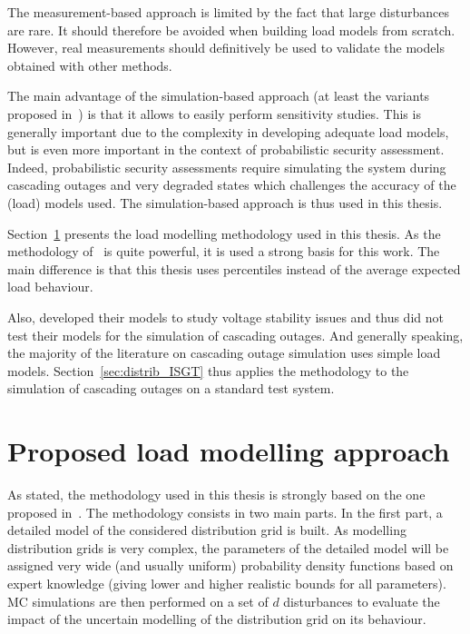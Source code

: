 The measurement-based approach is limited by the fact that large disturbances are rare. It should therefore be avoided when building load models from scratch. However, real measurements should definitively be used to validate the models obtained with other methods.

The main advantage of the simulation-based approach (at least the variants proposed in~\cite{ChaspierreThesis, ChaspierrePaper, Vorwerk}) is that it allows to easily perform sensitivity studies. This is generally important due to the complexity in developing adequate load models, but is even more important in the context of probabilistic security assessment. Indeed, probabilistic security assessments require simulating the system during cascading outages and very degraded states which challenges the accuracy of the (load) models used. The simulation-based approach is thus used in this thesis.

Section~\ref{sec:distrib_methodology} presents the load modelling methodology used in this thesis. As the methodology of~\cite{ChaspierreThesis, ChaspierrePaper} is quite powerful, it is used a strong basis for this work. The main difference is that this thesis uses percentiles instead of the average expected load behaviour.

Also, \cite{ChaspierreThesis, ChaspierrePaper} developed their models to study voltage stability issues and thus did not test their models for the simulation of cascading outages. And generally speaking, the majority of the literature on cascading outage simulation uses simple load models. Section~\ref{sec:distrib_ISGT} thus applies the methodology to the simulation of cascading outages on a standard test system.



\section{Proposed load modelling approach}
\label{sec:distrib_methodology}

As stated, the methodology used in this thesis is strongly based on the one proposed in~\cite{ChaspierrePaper, ChaspierreThesis}. The methodology consists in two main parts. In the first part, a detailed model of the considered distribution grid is built. As modelling distribution grids is very complex, the parameters of the detailed model will be assigned very wide (and usually uniform) probability density functions based on expert knowledge (giving lower and higher realistic bounds for all parameters). MC simulations are then performed on a set of \(d\) disturbances to evaluate the impact of the uncertain modelling of the distribution grid on its behaviour.

